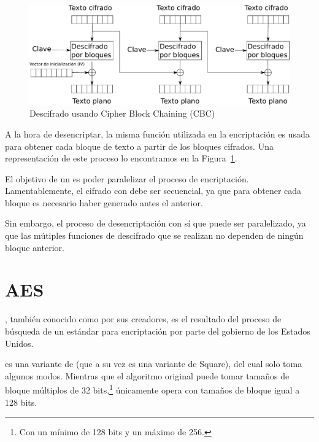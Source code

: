 \begin{figure}[ht]
  \centering
  \includegraphics[scale=0.5]{Figures/CBC_dec}
  \decoRule
  \caption[Cipher Block Chaining (CBC) - Descifrado]{Descifrado usando Cipher Block Chaining (CBC)}
  \label{fig:CBC_dec}
\end{figure}

A la hora de desencriptar, la misma función utilizada en la encriptación
es usada para obtener cada bloque de texto a partir de los bloques cifrados.
Una representación de este proceso lo encontramos en la Figura~\ref{fig:CBC_dec}.

El objetivo de un  es poder paralelizar el proceso de encriptación.
Lamentablemente, el cifrado con  debe ser secuencial,
ya que para obtener cada bloque es necesario haber generado antes el anterior.

Sin embargo, el proceso de desencriptación con  sí que puede ser paralelizado,
ya que las mútiples funciones de descifrado que se realizan no dependen de ningún bloque anterior. \emph{\parencite{Reference24}}


\section{AES}

, también conocido como  por sus creadores,
es el resultado del proceso de búsqueda de un estándar para encriptación por parte del gobierno de los Estados Unidos.

 es una variante de  (que a su vez es una variante de Square), del cual solo toma algunos modos.
Mientras que el algoritmo original puede tomar tamaños de bloque múltiplos de 32 bits,\footnote{Con un mínimo de 128 bits y un máximo de 256.}
 únicamente opera con tamaños de bloque igual a 128 bits.

